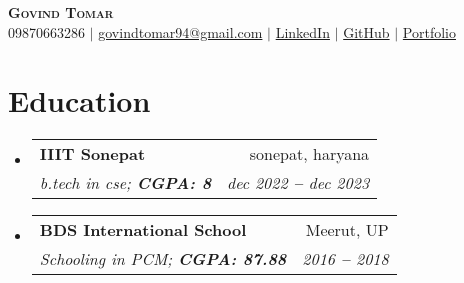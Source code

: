 \documentclass[letterpaper,11pt]{article}
\makeatletter
\newcommand{\resumeItem}[1]{
\item\small{
{#1 \vspace{-2pt}}
  }
}
\newcommand{\resumeSubheading}[4]{
  \vspace{-2pt}\item
    \begin{tabular*}{0.97\textwidth}[t]{l@{\extracolsep{\fill}}r}
      \textbf{#1} & #2 \\
      \textit{\small#3} & \textit{\small #4} \\
    \end{tabular*}\vspace{-7pt}
}
\newcommand{\resumeSubHeadingListStart}{\begin{itemize}[leftmargin=0.15in, label={}]}
\newcommand{\resumeSubHeadingListEnd}{\end{itemize}}
\newcommand{\resumeItemListStart}{\begin{itemize}}
\newcommand{\resumeItemListEnd}{\end{itemize}\vspace{-5pt}}
\makeatother
\begin{document}

\begin{center}
    \textbf{\Huge \scshape Govind Tomar} \\ \vspace{3pt}
    \small
    \faMobile \hspace{.5pt} {09870663286}
    $|$
    \faAt \hspace{.5pt} \href{mailto:govindtomar94@gmail.com}{govindtomar94@gmail.com}
    $|$
    \faLinkedinSquare \hspace{.5pt} \href{linkedin.com/govindtomar}{LinkedIn}
    $|$
    \faGithub \hspace{.5pt} \href{github.com/govindtomar}{GitHub}
    $|$
    \faGlobe \hspace{.5pt} \href{govindtomar.io}{Portfolio}
\end{center}




\section{Education}
  \vspace{3pt}
  \resumeSubHeadingListStart
  
\resumeSubheading
{IIIT Sonepat
}{sonepat, haryana}
{b.tech in cse;   \textbf{CGPA: 8}}{dec 2022 \textbf{--} dec 2023}

\resumeSubheading
{BDS International School
}{Meerut, UP}
{Schooling in PCM;   \textbf{CGPA: 87.88}}{2016 \textbf{--} 2018}

  \resumeSubHeadingListEnd




  

\end{document}
